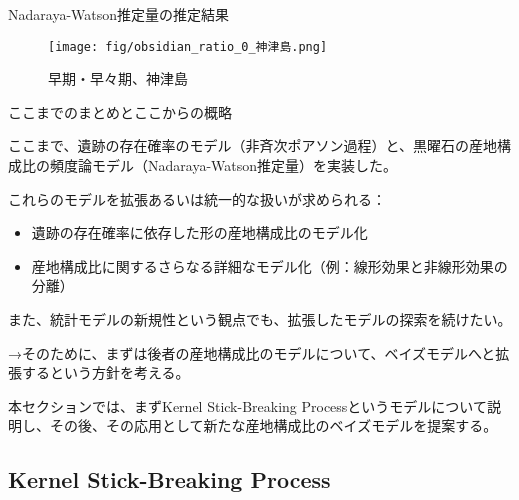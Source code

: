 \documentclass[xelatex, 8pt]{beamer}
\theoremstyle{plain}
\theoremstyle{definition}
\begin{document}
\begin{frame}{Nadaraya-Watson推定量の推定結果}
\begin{figure}\centering\texttt{[image: fig/obsidian\_ratio\_0\_神津島.png]}\caption{早期・早々期、神津島}
\end{figure}
\end{frame}

\begin{frame}{ここまでのまとめとここからの概略}

ここまで、遺跡の存在確率のモデル（非斉次ポアソン過程）と、黒曜石の産地構成比の頻度論モデル（Nadaraya-Watson推定量）を実装した。

\vspace{3mm}

これらのモデルを拡張あるいは統一的な扱いが求められる：

\begin{itemize}
    \item 遺跡の存在確率に依存した形の産地構成比のモデル化
    \item 産地構成比に関するさらなる詳細なモデル化（例：線形効果と非線形効果の分離）
\end{itemize}

また、統計モデルの新規性という観点でも、拡張したモデルの探索を続けたい。

\vspace{3mm}
→そのために、まずは後者の産地構成比のモデルについて、ベイズモデルへと拡張するという方針を考える。

本セクションでは、まずKernel Stick-Breaking Processというモデルについて説明し、その後、その応用として新たな産地構成比のベイズモデルを提案する。


\end{frame}

\subsection{Kernel Stick-Breaking Process}
\end{document}
